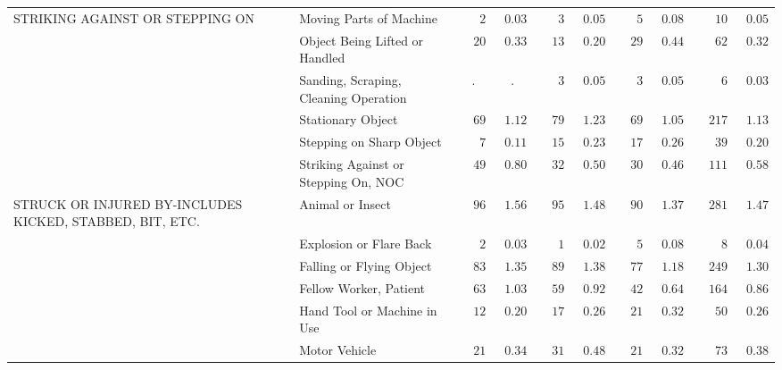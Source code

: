\documentclass[9pt, oneside]{article}   	%
\begin{document}
\begin{longtable}{p{1.8in}p{2.2in}cccccccc}
STRIKING AGAINST OR STEPPING ON & Moving Parts of Machine  & $\phantom{000}2$ & $\phantom{0}0.03$ & $\phantom{000}3$ & $\phantom{0}0.05$ & $\phantom{000}5$ & $\phantom{0}0.08$ & $\phantom{000}10$ & $\phantom{0}0.05$ \\
 & Object Being Lifted or Handled  & $\phantom{00}20$ & $\phantom{0}0.33$ & $\phantom{00}13$ & $\phantom{0}0.20$ & $\phantom{00}29$ & $\phantom{0}0.44$ & $\phantom{000}62$ & $\phantom{0}0.32$ \\
 & Sanding, Scraping, Cleaning Operation  & . & . & $\phantom{000}3$ & $\phantom{0}0.05$ & $\phantom{000}3$ & $\phantom{0}0.05$ & $\phantom{0000}6$ & $\phantom{0}0.03$ \\
 & Stationary Object  & $\phantom{00}69$ & $\phantom{0}1.12$ & $\phantom{00}79$ & $\phantom{0}1.23$ & $\phantom{00}69$ & $\phantom{0}1.05$ & $\phantom{00}217$ & $\phantom{0}1.13$ \\
 & Stepping on Sharp Object  & $\phantom{000}7$ & $\phantom{0}0.11$ & $\phantom{00}15$ & $\phantom{0}0.23$ & $\phantom{00}17$ & $\phantom{0}0.26$ & $\phantom{000}39$ & $\phantom{0}0.20$ \\
 & Striking Against or Stepping On, NOC  & $\phantom{00}49$ & $\phantom{0}0.80$ & $\phantom{00}32$ & $\phantom{0}0.50$ & $\phantom{00}30$ & $\phantom{0}0.46$ & $\phantom{00}111$ & $\phantom{0}0.58$ \\
STRUCK OR INJURED BY-INCLUDES KICKED, STABBED, BIT, ETC. & Animal or Insect  & $\phantom{00}96$ & $\phantom{0}1.56$ & $\phantom{00}95$ & $\phantom{0}1.48$ & $\phantom{00}90$ & $\phantom{0}1.37$ & $\phantom{00}281$ & $\phantom{0}1.47$ \\
 & Explosion or Flare Back  & $\phantom{000}2$ & $\phantom{0}0.03$ & $\phantom{000}1$ & $\phantom{0}0.02$ & $\phantom{000}5$ & $\phantom{0}0.08$ & $\phantom{0000}8$ & $\phantom{0}0.04$ \\
 & Falling or Flying Object  & $\phantom{00}83$ & $\phantom{0}1.35$ & $\phantom{00}89$ & $\phantom{0}1.38$ & $\phantom{00}77$ & $\phantom{0}1.18$ & $\phantom{00}249$ & $\phantom{0}1.30$ \\
 & Fellow Worker, Patient  & $\phantom{00}63$ & $\phantom{0}1.03$ & $\phantom{00}59$ & $\phantom{0}0.92$ & $\phantom{00}42$ & $\phantom{0}0.64$ & $\phantom{00}164$ & $\phantom{0}0.86$ \\
 & Hand Tool or Machine in Use  & $\phantom{00}12$ & $\phantom{0}0.20$ & $\phantom{00}17$ & $\phantom{0}0.26$ & $\phantom{00}21$ & $\phantom{0}0.32$ & $\phantom{000}50$ & $\phantom{0}0.26$ \\
 & Motor Vehicle  & $\phantom{00}21$ & $\phantom{0}0.34$ & $\phantom{00}31$ & $\phantom{0}0.48$ & $\phantom{00}21$ & $\phantom{0}0.32$ & $\phantom{000}73$ & $\phantom{0}0.38$ \\

\end{longtable}
\end{document}
